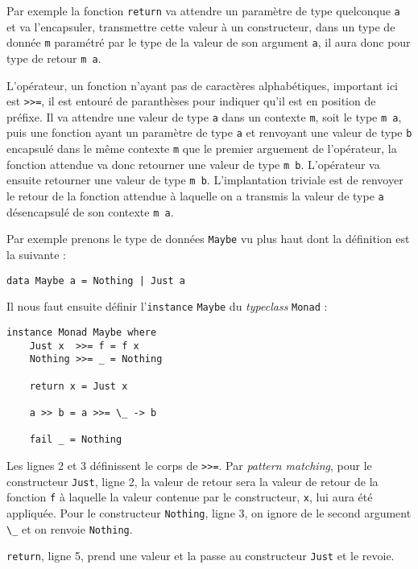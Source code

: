 \documentclass{llncs}
\begin{document}
Par exemple la fonction \lstinline{return} va attendre un paramètre de type quelconque
\lstinline{a} et va l'encapsuler, transmettre cette valeur à un constructeur, dans
un type de donnée \lstinline{m} paramétré par le type de la valeur de son argument
\lstinline{a}, il aura donc pour type de retour \lstinline{m a}.

L'opérateur, un fonction n'ayant pas de caractères alphabétiques, important ici
est \lstinline{>>=}, il est entouré de paranthèses pour indiquer qu'il est en
position de préfixe.
Il va attendre une valeur de type \lstinline{a} dans un contexte \lstinline{m}, soit
le type \lstinline{m a}, puis une fonction ayant un paramètre de type \lstinline{a}
et renvoyant une valeur de type \lstinline{b} encapsulé dans le même contexte \lstinline{m}
que le premier arguement de l'opérateur, la fonction attendue va donc retourner
une valeur de type \lstinline{m b}. L'opérateur va ensuite retourner une valeur de
type \lstinline{m b}.
L'implantation triviale est de renvoyer le retour de la fonction attendue à
laquelle on a transmis la valeur de type \lstinline{a} désencapsulé de son contexte
\lstinline{m a}.

Par exemple prenons le type de données \lstinline{Maybe} vu plus haut dont la définition
est la suivante :
\begin{lstlisting}
data Maybe a = Nothing | Just a
\end{lstlisting}

Il nous faut ensuite définir l'\lstinline{instance} \lstinline{Maybe} du \emph{typeclass}
\lstinline{Monad} :
\begin{lstlisting}
instance Monad Maybe where
    Just x  >>= f = f x
    Nothing >>= _ = Nothing

    return x = Just x

    a >> b = a >>= \_ -> b

    fail _ = Nothing
\end{lstlisting}

Les lignes 2 et 3 définissent le corps de \lstinline{>>=}.
Par \emph{pattern matching}, pour le constructeur \lstinline{Just}, ligne 2,
la valeur de retour sera la valeur de retour de la fonction \lstinline{f} à
laquelle la valeur contenue par le constructeur, \lstinline{x}, lui aura été appliquée.
Pour le constructeur \lstinline{Nothing}, ligne 3, on ignore de le second argument
\lstinline{\_} et on renvoie \lstinline{Nothing}.

\lstinline{return}, ligne 5, prend une valeur et la passe au constructeur
\lstinline{Just} et le revoie.
\end{document}
